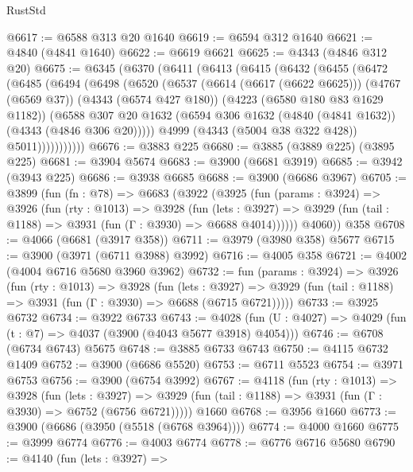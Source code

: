 \begin{lexlean}{RustStd}
\begin{coremodule}
@6617 := @6588 @313 @20 @1640
@6619 := @6594 @312 @1640
@6621 := @4840 (@4841 @1640)
@6622 := @6619 @6621
@6625 := @4343 (@4846 @312 @20)
@6675 := @6345
    (@6370
      (@6411
        (@6413
          (@6415
            (@6432
              (@6455
                (@6472
                  (@6485
                    (@6494
                      (@6498
                        (@6520
                          (@6537
                            (@6614 (@6617 (@6622 @6625)))
                            (@4767 (@6569 @37))
                            (@4343 (@6574 @427 @180))
                            (@4223 (@6580 @180 @83 @1629 @1182))
                            (@6588
                              @307
                              @20
                              @1632
                              (@6594 @306 @1632 (@4840 (@4841 @1632)) (@4343 (@4846 @306 @20)))))
                          @4999
                          (@4343 (@5004 @38 @322 @428))
                          @5011)))))))))))
@6676 := @3883 @225
@6680 := @3885 (@3889 @225) (@3895 @225)
@6681 := @3904 @5674
@6683 := @3900 (@6681 @3919)
@6685 := @3942 (@3943 @225)
@6686 := @3938 @6685
@6688 := @3900 (@6686 @3967)
@6705 := @3899
    (fun (fn : @78) =>
    @6683
      (@3922
        (@3925
          (fun (params : @3924) =>
          @3926
            (fun (rty : @1013) =>
            @3928
              (fun (lets : @3927) =>
              @3929 (fun (tail : @1188) => @3931 (fun (Γ : @3930) => @6688 @4014))))))
        @4060))
    @358
@6708 := @4066 (@6681 (@3917 @358))
@6711 := @3979 (@3980 @358) @5677
@6715 := @3900 (@3971 (@6711 @3988) @3992)
@6716 := @4005 @358
@6721 := @4002 (@4004 @6716 @5680 @3960 @3962)
@6732 := fun (params : @3924) =>
  @3926
    (fun (rty : @1013) =>
    @3928
      (fun (lets : @3927) =>
      @3929 (fun (tail : @1188) => @3931 (fun (Γ : @3930) => @6688 (@6715 @6721)))))
@6733 := @3925 @6732
@6734 := @3922 @6733
@6743 := @4028 (fun (U : @4027) => @4029 (fun (t : @7) => @4037 (@3900 (@4043 @5677 @3918) @4054)))
@6746 := @6708 (@6734 @6743) @5675
@6748 := @3885 @6733 @6743
@6750 := @4115 @6732 @1409
@6752 := @3900 (@6686 @5520)
@6753 := @6711 @5523
@6754 := @3971 @6753
@6756 := @3900 (@6754 @3992)
@6767 := @4118
    (fun (rty : @1013) =>
    @3928
      (fun (lets : @3927) =>
      @3929 (fun (tail : @1188) => @3931 (fun (Γ : @3930) => @6752 (@6756 @6721)))))
    @1660
@6768 := @3956 @1660
@6773 := @3900 (@6686 (@3950 (@5518 (@6768 @3964))))
@6774 := @4000 @1660
@6775 := @3999 @6774
@6776 := @4003 @6774
@6778 := @6776 @6716 @5680
@6790 := @4140
    (fun (lets : @3927) =>

\end{coremodule}
\end{lexlean}
